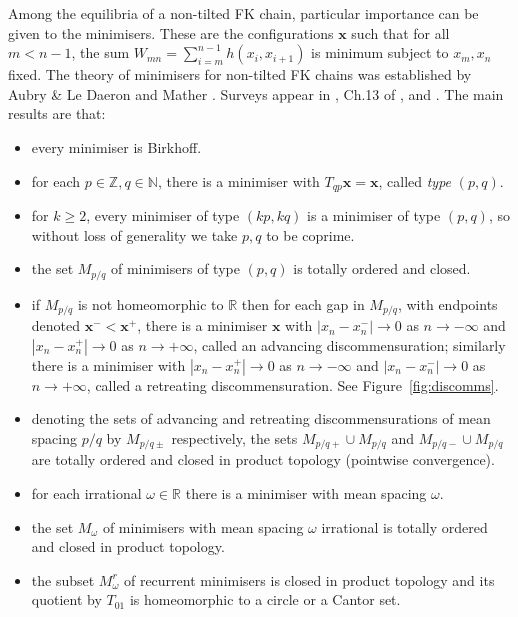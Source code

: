 \documentclass[12pt]{article}
\newcommand{\R}{\mathbb{R}}
\newcommand{\Z}{\mathbb{Z}}
\newcommand{\N}{\mathbb{N}}
\newcommand{\xbf}{{\mathbf{x}}}
\begin{document}
Among the equilibria of a non-tilted FK chain, particular importance can be given to the minimisers.  These are the configurations $\xbf$ such that for all $m<n-1$, the sum $W_{mn} = \sum_{i=m}^{n-1} h(x_i,x_{i+1})$ is minimum subject to $x_m,x_n$ fixed.
The theory of minimisers for non-tilted FK chains was established by Aubry \& Le Daeron \cite{ALD} and Mather \cite{Mat1}.  Surveys appear in \cite{Ban}, Ch.13 of \cite{KH}, \cite{MS} and \cite{Ba}.
The main results are that:
\begin{itemize}
\item every minimiser is Birkhoff. %
\item for each $p\in\Z, q\in\N$, there is a minimiser with $T_{qp}\xbf = \xbf$, called {\em type} $(p,q)$.
\item for $k\ge 2$, every minimiser of type $(kp,kq)$ is a minimiser of type $(p,q)$, so without loss of generality we take $p, q$ to be coprime.
\item the set $M_{p/q}$ of minimisers of type $(p,q)$ is totally ordered and closed.
\item if $M_{p/q}$ is not homeomorphic to $\R$ then for each gap in $M_{p/q}$, with endpoints denoted $\xbf^- < \xbf^+$, there is a minimiser $\xbf$ with $|x_n-x^-_n| \to 0$ as $n \to -\infty$ and $|x_n-x^+_n| \to 0$ as $n \to +\infty$, called an advancing discommensuration; similarly there is a minimiser with $|x_n-x^+_n| \to 0$ as $n \to -\infty$ and $|x_n-x^-_n| \to 0$ as $n \to +\infty$, called a retreating discommensuration.  See Figure~\ref{fig:discomms}.
\item denoting the sets of advancing and retreating discommensurations of mean spacing $p/q$ by $M_{p/q\pm}$ respectively, the sets $M_{p/q+}\cup M_{p/q}$ and $M_{p/q-}\cup M_{p/q}$ are totally ordered and closed in product topology (pointwise convergence).
\item for each irrational $\omega \in \R$ there is a minimiser with mean spacing $\omega$.
\item the set $M_\omega$ of minimisers with mean spacing $\omega$ irrational is totally ordered and closed in product topology.
\item the subset $M_\omega^r$ of recurrent minimisers is closed in product topology and its quotient by $T_{01}$ is homeomorphic to a circle or a Cantor set.
\end{itemize}
\end{document}
